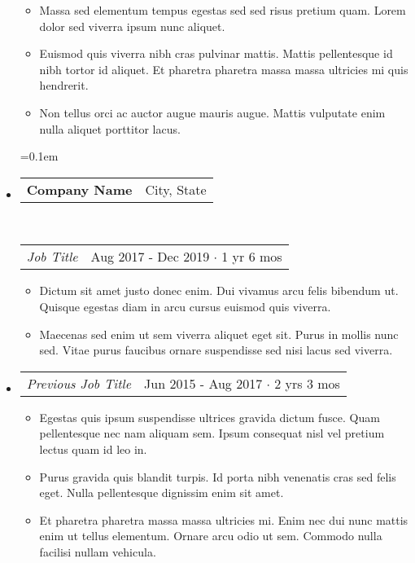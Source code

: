 \documentclass[10pt,letterpaper]{article}
\makeatletter
\newcommand{\headerrow}[2]
{\begin{tabular*}{\linewidth}{l@{\extracolsep{\fill}}r}
	#1 &
	#2 \\
\end{tabular*}}
\makeatother
\begin{document}
\begin{itemize}[leftmargin=0cm]
\begin{itemize}[leftmargin=.43cm]
		\item Massa sed elementum tempus egestas sed sed risus pretium quam. Lorem dolor sed viverra ipsum nunc aliquet.

	\item Euismod quis viverra nibh cras pulvinar mattis. Mattis pellentesque id nibh tortor id aliquet. Et pharetra pharetra massa massa ultricies mi quis hendrerit. 


		\item Non tellus orci ac auctor augue mauris augue. Mattis vulputate enim nulla aliquet porttitor lacus.

		
		
	\end{itemize}	

\setlength{\itemsep}{1pt}
  \setlength{\parskip}{0pt}
  \setlength{\parsep}{0pt}
	\parskip=0.1em
	\item[]
	\headerrow
		{\textbf{Company Name}}
		{{{City, State}}}
	\\
	\headerrow
		{\emph{Job Title}}
		{{Aug 2017 - Dec 2019 $\cdot$ 1 yr 6 mos}}
	\begin{itemize}[leftmargin=.43cm]
	\setlength{\itemsep}{1pt}
  \setlength{\parskip}{0pt}
  \setlength{\parsep}{0pt}
	

		\item Dictum sit amet justo donec enim. Dui vivamus arcu felis bibendum ut. Quisque egestas diam in arcu cursus euismod quis viverra. 
		
	
		\item Maecenas sed enim ut sem viverra aliquet eget sit. Purus in mollis nunc sed. Vitae purus faucibus ornare suspendisse sed nisi lacus sed viverra. 
		
		
	\end{itemize}	
		
		\item[]
	\headerrow
		{\emph{Previous Job Title}}
		{{Jun 2015 - Aug 2017 $\cdot$ 2 yrs 3 mos}}
	
	
	\begin{itemize}[leftmargin=.43cm]
	\setlength{\itemsep}{1pt}
  \setlength{\parskip}{0pt}
  \setlength{\parsep}{0pt}

  		
		\item Egestas quis ipsum suspendisse ultrices gravida dictum fusce. Quam pellentesque nec nam aliquam sem. Ipsum consequat nisl vel pretium lectus quam id leo in.
		
  		\item Purus gravida quis blandit turpis. Id porta nibh venenatis cras sed felis eget. Nulla pellentesque dignissim enim sit amet.

		
		\item Et pharetra pharetra massa massa ultricies mi. Enim nec dui nunc mattis enim ut tellus elementum.  Ornare arcu odio ut sem. Commodo nulla facilisi nullam vehicula. 
		
	\end{itemize}	
	


\end{itemize}
\end{document}
